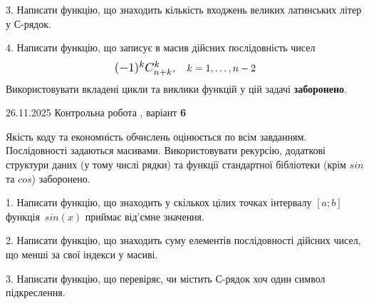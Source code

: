 \documentclass[11pt, ukrainian]{article}
\begin{document}
{{{{{\begin {large}

3. Написати функцію, що знаходить кількість входжень великих латинських літер у С-рядок.

\vspace{2mm}


4. 
Написати функцію, що записує в масив дійсних послідовність чисел
$$\scalebox{1.2}{$(-1)^{k}C_{n+k}^{k}$}, \quad k=1,\ldots,n-2$$
\quad Використовувати вкладені цикли та виклики функцій у цій задачі \textbf{заборонено}.

\vspace{2mm}

\end{large}
\vspace{20mm}


{{26.11.2025 Контрольна робота , варіант  \No \textbf { 6 }\par}}


{
Якість коду та економність обчислень оцінюється по всім завданням. Послідовності задаються масивами. Використовувати рекурсію, додаткові структури даних (у тому числі рядки) та функції стандартної бібліотеки (крім $sin$ та $cos$) заборонено.

\vspace{2mm}

\begin {large}
1. Написати функцію, що знаходить у скількох цілих точках інтервалу $[a; b]$ функція~$sin(x)$ приймає від'ємне значення.

\vspace{2mm}


2. Написати функцію, що знаходить суму елементів послідовності дійсних чисел, що менші за свої індекси у масиві.

\vspace{2mm}


3. Написати функцію, що перевіряє, чи містить С-рядок хоч один символ підкреслення.

\vspace{2mm}


\end{large}}}}}}}
\end{document}

